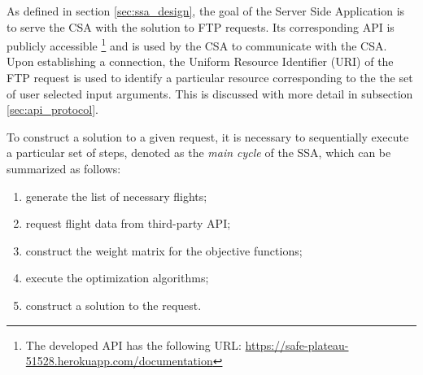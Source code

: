 As defined in section \ref{sec:ssa_design}, the goal of the Server Side Application is to serve the CSA with the solution to FTP requests. Its corresponding API is publicly accessible \footnote{The developed API has the following URL: \url{https://safe-plateau-51528.herokuapp.com/documentation}} and is used by the CSA to communicate with the CSA. Upon establishing a connection, the Uniform Resource Identifier (URI) of the FTP request is used to identify a particular resource corresponding to the the set of user selected input arguments. This is discussed with more detail in subsection \ref{sec:api_protocol}.




To construct a solution to a given request, it is necessary to sequentially execute a particular set of steps, denoted as the \textit{main cycle} of the SSA, which can be summarized as follows: 

\begin{enumerate}%
  \item generate the list of necessary flights;
  \item request flight data from third-party API;
  \item construct the weight matrix for the objective functions;
  \item execute the optimization algorithms;
  \item construct a solution to the request.
\end{enumerate}

